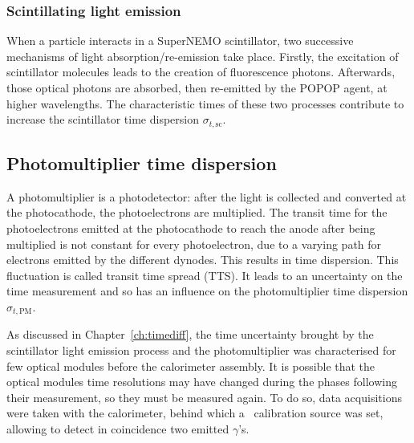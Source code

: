 \subsubsection*{Scintillating light emission}
When a particle interacts in a SuperNEMO scintillator, two successive mechanisms of light absorption/re-emission take place.
Firstly, the excitation of scintillator molecules leads to the creation of fluorescence photons.
Afterwards, those optical photons are absorbed, then re-emitted by the POPOP agent, at higher wavelengths.
The characteristic times of these two processes contribute to increase the scintillator time dispersion $\sigma_{t,\text{sc}}$.

\subsection{Photomultiplier time dispersion}

A photomultiplier is a photodetector: after the light is collected and converted at the photocathode, the photoelectrons are multiplied.
The transit time for the photoelectrons emitted at the photocathode to reach the anode after being multiplied is not constant for every photoelectron, due to a varying path for electrons emitted by the different dynodes.
This results in time dispersion.
This fluctuation is called transit time spread (TTS).
It leads to an uncertainty on the time measurement and so has an influence on the photomultiplier time dispersion $\sigma_{t,\text{PM}}$.

As discussed in Chapter~\ref{ch:timediff}, the time uncertainty brought by the scintillator light emission process and the photomultiplier was characterised for few optical modules before the calorimeter assembly.
It is possible that the optical modules time resolutions may have changed during the phases following their measurement, so they must be measured again.
To do so, data acquisitions were taken with the calorimeter, behind which a \Co\ calibration source was set, allowing to detect in coincidence two emitted $\gamma$'s.


